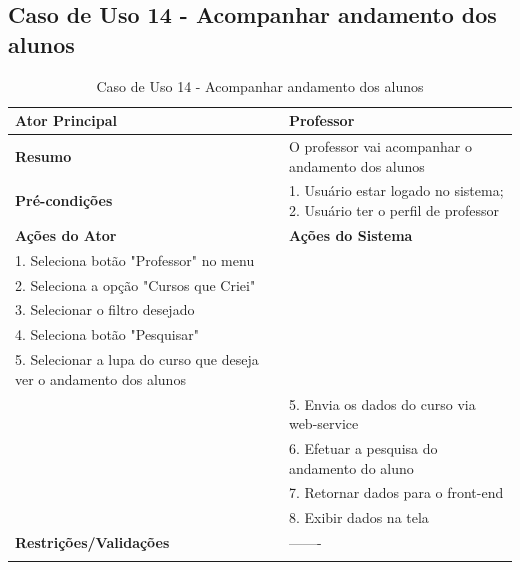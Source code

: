 \subsection{Caso de Uso 14 - Acompanhar andamento dos alunos}
\label{sc:case10}
\begin{center}
\begin{longtable}{p{8cm}|p{8cm}}
    \hline
    \textbf{Ator Principal} & Professor \\
    \hline
    \textbf{Resumo} & O professor vai acompanhar o andamento dos alunos \\
    \hline
    \textbf{Pr\'{e}-condi\c{c}\~{o}es} & 1. Usuário estar logado no sistema; 2. Usuário ter o perfil de professor \\
    \hline
    \textbf{A\c{c}\~{o}es do Ator} & \textbf{A\c{c}\~{o}es do Sistema} \\
    \hline
    1. Seleciona botão "Professor" no menu \\
    \hline
    2. Seleciona a opção "Cursos que Criei" \\
	\hline
    3. Selecionar o filtro desejado \\
	\hline
    4. Seleciona botão "Pesquisar" \\
	\hline
    5. Selecionar a lupa do curso que deseja ver o andamento dos alunos \\
    \hline
    & 5. Envia os dados do curso via web-service \\
	\hline
    & 6. Efetuar a pesquisa do andamento do aluno \\
	\hline
    & 7. Retornar dados para o front-end \\
	\hline
    & 8. Exibir dados na tela \\
    \hline
    \hline
    \textbf{Restri\c{c}\~{o}es/Valida\c{c}\~{o}es} & -------\\
\hline
\caption{Caso de Uso 14 - Acompanhar andamento dos alunos}
\end{longtable}
\end{center}

